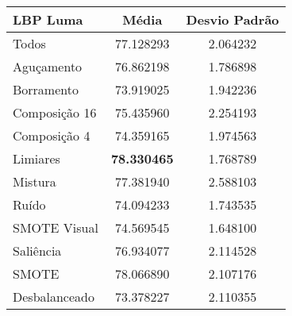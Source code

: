 

\begin{table}[!htbp]
\centering
\caption{}
\label{tab:resultados:x:melhor}
\begin{tabular}{|l|c|c|}
\hline
\textbf{LBP Luma} & \textbf{Média}     & \textbf{Desvio Padrão} \\ \hline
   Todos        &  77.128293 &  2.064232  \\ \hline
  Aguçamento    &  76.862198 &  1.786898  \\ \hline
  Borramento    &  73.919025 &  1.942236  \\ \hline
  Composição 16 &  75.435960 &  2.254193  \\ \hline
  Composição 4  &  74.359165 &  1.974563  \\ \hline
  Limiares      &  \textbf{78.330465} &  1.768789  \\ \hline
  Mistura       &  77.381940 &  2.588103  \\ \hline
  Ruído         &  74.094233 &  1.743535  \\ \hline
  SMOTE Visual  &  74.569545 &  1.648100  \\ \hline
  Saliência     &  76.934077 &  2.114528  \\ \hline
 SMOTE          &  78.066890 &  2.107176  \\ \hline
Desbalanceado   &  73.378227 &  2.110355  \\ \hline
\end{tabular}
\end{table}


